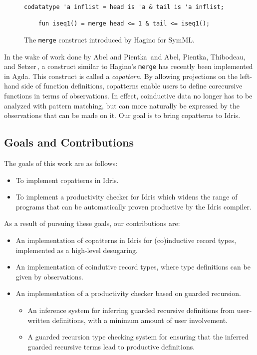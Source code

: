 
\begin{figure}[H]
  \centering
  \begin{lstlisting}[mathescape]
    codatatype 'a inflist = head is 'a & tail is 'a inflist;

    fun iseq1() = merge head <= 1 & tail <= iseq1();
  \end{lstlisting}
  \caption{The \texttt{merge} construct introduced by Hagino for SymML.}
  \label{fig:merge_hagino}
\end{figure}

In the wake of work done by Abel and Pientka\,\citep{Abel13Wellfounded} and
Abel, Pientka, Thibodeau, and Setzer\,\citep{Abel13Copatterns}, a construct
similar to Hagino's \texttt{merge} has recently been implemented in Agda. This
construct is called a \emph{copattern}. By allowing projections on the left-hand
side of function definitions, copatterns enable users to define corecursive
functions in terms of observations. In effect, coinductive data no longer has to
be analyzed with pattern matching, but can more naturally be expressed by the
observations that can be made on it. Our goal is to bring copatterns to Idris.


\subsection{Goals and Contributions}
The goals of this work are as follows:

\begin{itemize}
\item To implement copatterns in Idris.
\item To implement a productivity checker for Idris which widens the range of
  programs that can be automatically proven productive by the Idris compiler.
\end{itemize}

As a result of pursuing these goals, our contributions are:

\begin{itemize}
\item An implementation of copatterns in Idris for (co)inductive record types,
  implemented as a high-level desugaring.
\item An implementation of coindutive record types, where type definitions can be
  given by observations.
\item An implementation of a productivity checker based on guarded recursion. 
  \begin{itemize}
    \item An inference system for inferring guarded recursive definitions
      from user-written definitions, with a minimum amount of user involvement.
    \item A guarded recursion type checking system for ensuring that the
      inferred guarded recursive terms lead to productive definitions.
  \end{itemize}
\end{itemize}

